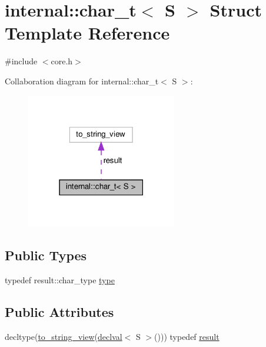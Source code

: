 \hypertarget{structinternal_1_1char__t}{}\section{internal\+:\+:char\+\_\+t$<$ S $>$ Struct Template Reference}
\label{structinternal_1_1char__t}


{\ttfamily \#include $<$core.\+h$>$}



Collaboration diagram for internal\+:\+:char\+\_\+t$<$ S $>$\+:
\nopagebreak
\begin{figure}[H]
\begin{center}
\leavevmode
\includegraphics[width=186pt]{structinternal_1_1char__t__coll__graph}
\end{center}
\end{figure}
\subsection*{Public Types}
\begin{DoxyCompactItemize}
\item 
typedef result\+::char\+\_\+type \hyperlink{structinternal_1_1char__t_a2c8d562d0da17ea0c810a6cd7dbb2981}{type}
\end{DoxyCompactItemize}
\subsection*{Public Attributes}
\begin{DoxyCompactItemize}
\item 
decltype(\hyperlink{namespaceinternal_a153fda3826e43649ab74f70396f9d5bc}{to\+\_\+string\+\_\+view}(\hyperlink{namespaceinternal_a5f61aadb1d6afc8b79ef7ea57c39eafc}{declval}$<$ S $>$())) typedef \hyperlink{structinternal_1_1char__t_a9014c6328d3190e6cb5869962aa8c3f2}{result}
\end{DoxyCompactItemize}


